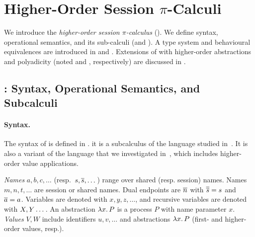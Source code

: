 \documentclass[runningheads]{llncs}
\begin{document}
{%

\section{Higher-Order Session $\pi$-Calculi}
\label{sec:calculus}

We introduce 
the \emph{higher-order session $\pi$-calculus} (\HOp).
We define 
syntax, operational semantics, and 
its sub-calculi (\sessp and \HO).
A type system and behavioural equivalences are introduced in 
 and . 
Extensions of \HOp 
with higher-order abstractions and polyadicity (noted \HOpp and \PHOp, respectively) 
are discussed in .




\subsection{\HOp: Syntax, Operational Semantics, and Subcalculi}
\label{subsec:syntax}

\paragraph{Syntax.}
The syntax of \HOp is defined in .
\HOp it is a subcalculus of the language studied 
in~\cite{tlca07}. It is also a variant of the language that we investigated in~\cite{characteristic_bis}, 
which includes higher-order value applications. 




\emph{Names} $a,b,c, \dots$ (resp.~$s, \overline{s}, \dots$) 
range over shared (resp. session) names. 
Names $m, n, t, \dots$ are session or shared names.
Dual endpoints are $\overline{n}$ with
$\overline{\overline{s}} = s$ and $\overline{a} = a$.
Variables are denoted with $x, y, z, \dots$, 
and recursive variables are denoted with $X, Y \dots$.
An abstraction %
$\lambda x.\,P$ is a process $P$ with name parameter $x$.
\emph{Values} $V,W$ include 
identifiers $u, v, \ldots$ %
and 
abstractions $\lambda x.\,P$ (first- and higher-order values, resp.). 

}
\end{document}
